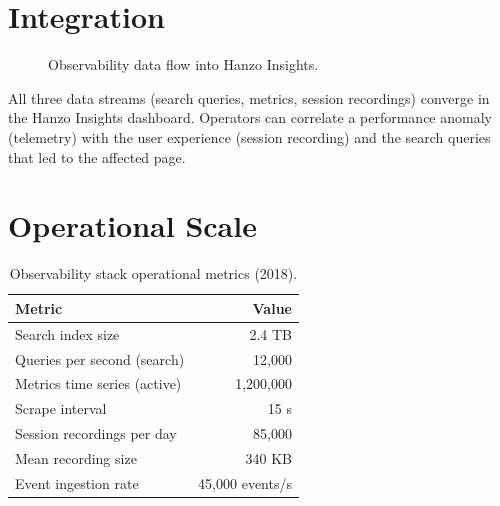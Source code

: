 \documentclass[11pt,a4paper]{article}
\begin{document}
\section{Integration}

\begin{figure}[h]
\centering
{}
\caption{Observability data flow into Hanzo Insights.}
\end{figure}

All three data streams (search queries, metrics, session recordings) converge in the Hanzo Insights dashboard. Operators can correlate a performance anomaly (telemetry) with the user experience (session recording) and the search queries that led to the affected page.

\section{Operational Scale}

\begin{table}[h]
\centering
\caption{Observability stack operational metrics (2018).}
\begin{tabular}{lr}
\toprule
\textbf{Metric} & \textbf{Value} \\
\midrule
Search index size & 2.4 TB \\
Queries per second (search) & 12{,}000 \\
Metrics time series (active) & 1{,}200{,}000 \\
Scrape interval & 15 s \\
Session recordings per day & 85{,}000 \\
Mean recording size & 340 KB \\
Event ingestion rate & 45{,}000 events/s \\
\bottomrule
\end{tabular}
\end{table}
\end{document}
